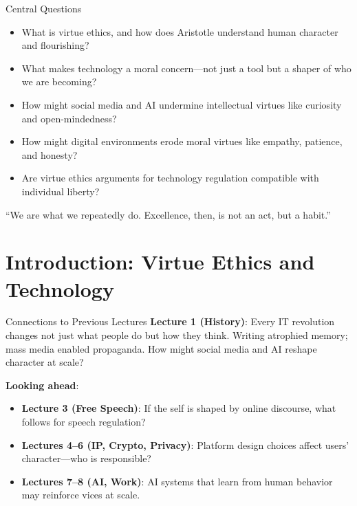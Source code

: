 ﻿\documentclass[aspectratio=169,11pt]{beamer}
\begin{document}
\begin{frame}{Central Questions}
\begin{itemize}
    \item What is virtue ethics, and how does Aristotle understand human character and flourishing?
    \item What makes technology a moral concern---not just a tool but a shaper of who we are becoming?
    \item How might social media and AI undermine intellectual virtues like curiosity and open-mindedness?
    \item How might digital environments erode moral virtues like empathy, patience, and honesty?
    \item Are virtue ethics arguments for technology regulation compatible with individual liberty?
\end{itemize}

\vspace{0.2cm}
\begin{quotebox}
``We are what we repeatedly do. Excellence, then, is not an act, but a habit.''
\end{quotebox}
\end{frame}

\section{Introduction: Virtue Ethics and Technology}

\begin{frame}{Connections to Previous Lectures}
\textbf{Lecture 1 (History)}: Every IT revolution changes not just what people do but how they think. Writing atrophied memory; mass media enabled propaganda. How might social media and AI reshape character at scale?

\vspace{0.2cm}
\textbf{Looking ahead}:
\begin{itemize}
    \item \textbf{Lecture 3 (Free Speech)}: If the self is shaped by online discourse, what follows for speech regulation?
    \item \textbf{Lectures 4--6 (IP, Crypto, Privacy)}: Platform design choices affect users' character---who is responsible?
    \item \textbf{Lectures 7--8 (AI, Work)}: AI systems that learn from human behavior may reinforce vices at scale.
\end{itemize}
\end{frame}
\end{document}

